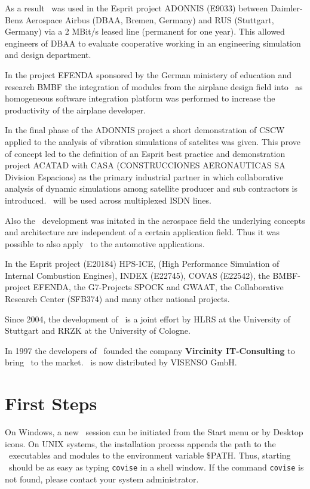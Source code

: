  As a result \covise\ was used in the Esprit project ADONNIS (E9033) between Daimler-Benz Aerospace
 Airbus (DBAA, Bremen, Germany) and RUS (Stuttgart, Germany) via a 2 MBit/s leased line (permanent for
 one year). This allowed engineers of DBAA to evaluate cooperative working in an engineering simulation
 and design department. 

 In the project EFENDA sponsored by the German ministery of education and research BMBF the integration
 of modules from the airplane design field into \covise\ as homogeneous software integration platform was
 performed to increase the productivity of the airplane developer.  

 In the final phase of the ADONNIS project a short demonstration of CSCW applied to the analysis of
 vibration simulations of satelites was given. This prove of concept led to the definition of an Esprit best
 practice and demonstration project ACATAD with CASA (CONSTRUCCIONES AERONAUTICAS SA
 Division Espacioas) as the primary industrial partner in which collaborative analysis of dynamic simulations
 among satellite producer and sub contractors is introduced. \covise\ will be used across multiplexed ISDN
 lines. 

 Also the \covise\ development was initated in the aerospace field the underlying concepts and architecture
 are independent of a certain application field. Thus it was possible to also apply \covise\ to the automotive
 applications. 

 In the Esprit project (E20184) HPS-ICE, (High Performance Simulation of Internal Combustion Engines),
 INDEX (E22745), COVAS (E22542), the BMBF-project EFENDA, the G7-Projects SPOCK and GWAAT,
 the Collaborative Research Center (SFB374) and many other national projects. 

 Since 2004, the development of \covise\ is a joint effort by HLRS at the University of Stuttgart
 and RRZK at the University of Cologne.

 In 1997 the developers of \covise\ founded the company {\bf Vircinity IT-Consulting} 
 to bring \covise\ to the market. \covise\ is now distributed by VISENSO GmbH.

\section{First Steps}


On Windows, a new \covise\ session can be initiated from the Start menu or by Desktop icons.
On UNIX systems, the installation process appends the path to the \covise\ executables
and modules to the environment variable \$PATH.
Thus, starting \covise\ should be as easy as typing \verb/covise/ in a shell window.
If the command \verb/covise/ is not found, please contact your system administrator.

